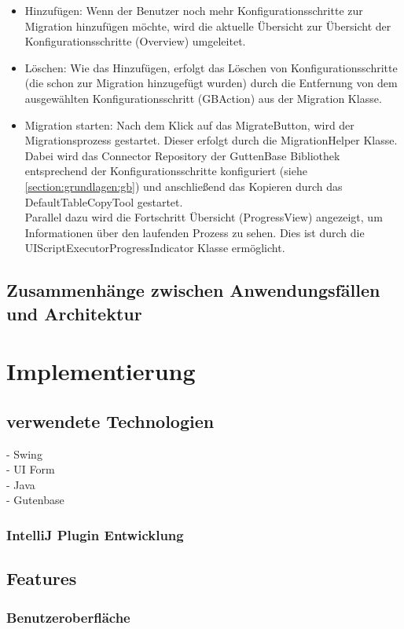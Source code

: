 \begin{itemize}
	\item Hinzufügen: Wenn der Benutzer noch mehr Konfigurationsschritte zur Migration hinzufügen möchte, wird die aktuelle Übersicht zur Übersicht der Konfigurationsschritte (Overview) umgeleitet.
	\item Löschen: Wie das Hinzufügen, erfolgt das Löschen von Konfigurationsschritte (die schon zur Migration hinzugefügt wurden) durch die Entfernung von dem ausgewählten Konfigurationsschritt (GBAction) aus der Migration Klasse. 
	\item Migration starten: Nach dem Klick auf das \glqq Migrate\grqq Button, wird der Migrationsprozess gestartet. Dieser erfolgt durch die MigrationHelper Klasse. Dabei wird das Connector Repository der GuttenBase Bibliothek entsprechend der Konfigurationsschritte konfiguriert (siehe \ref{section:grundlagen:gb}) und anschließend das Kopieren durch das DefaultTableCopyTool gestartet. \\
	Parallel dazu wird die Fortschritt Übersicht (ProgressView) angezeigt, um Informationen über den laufenden Prozess zu sehen. Dies ist durch die UIScriptExecutorProgressIndicator Klasse ermöglicht.
	
\end{itemize}

%
\subsection{Zusammenhänge zwischen Anwendungsfällen und Architektur}


\section{Implementierung}
\subsection{verwendete Technologien}
- Swing \\
- UI Form \\
- Java\\
- Gutenbase
\subsubsection{IntelliJ Plugin Entwicklung}




\subsection{Features}
\subsubsection{Benutzeroberfläche}



